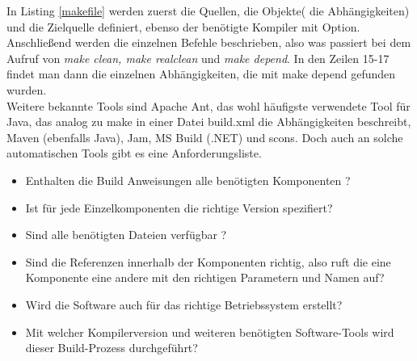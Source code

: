 In Listing \ref{makefile} werden zuerst die Quellen, die Objekte( die Abhängigkeiten) und die Zielquelle definiert, ebenso der benötigte Kompiler mit Option.
Anschließend werden die einzelnen Befehle beschrieben, also was passiert bei dem Aufruf von \textit{make clean, make realclean} und \textit{make depend}. In den Zeilen 15-17 findet man dann die einzelnen Abhängigkeiten, die mit make depend gefunden wurden.
\\
Weitere bekannte Tools sind Apache Ant, das wohl häufigste verwendete Tool für Java, das analog zu make in einer Datei build.xml die Abhängigkeiten beschreibt, Maven (ebenfalls Java), Jam, MS Build (.NET) und scons.
Doch auch an solche automatischen Tools gibt es eine Anforderungsliste. 
\cite{bib:se}
\begin{itemize}
\item Enthalten die Build Anweisungen alle benötigten Komponenten ?
\item Ist für jede Einzelkomponenten die richtige Version spezifiert?
\item Sind alle benötigten Dateien verfügbar ?
\item Sind die Referenzen innerhalb der Komponenten richtig, also ruft die eine Komponente eine andere mit den richtigen Parametern und Namen auf?
\item Wird die Software auch für das richtige Betriebssystem erstellt?
\item Mit welcher Kompilerversion und weiteren benötigten Software-Tools wird dieser Build-Prozess durchgeführt? 	
\end{itemize}

